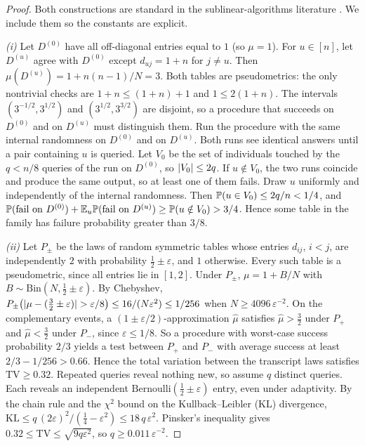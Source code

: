 \begin{proof}
Both constructions are standard in the sublinear-algorithms literature
\citep{barhum2007approximating,goldreich2008approximating}. We include them so
the constants are explicit.

\emph{(i)} Let $D^{(0)}$ have all off-diagonal entries equal to $1$ (so $\mu=1$).
For $u\in[n]$, let $D^{(u)}$ agree with $D^{(0)}$ except $d_{uj}=1+n$ for $j\neq u$.
Then $\mu(D^{(u)})=1+n(n-1)/N=3$. Both tables are pseudometrics: the only
nontrivial checks are $1+n\le(1+n)+1$ and $1\le2(1+n)$. The intervals
$(3^{-1/2},3^{1/2})$ and $(3^{1/2},3^{3/2})$ are disjoint, so a procedure that
succeeds on $D^{(0)}$ and on $D^{(u)}$ must distinguish them. Run the procedure with
the same internal randomness on $D^{(0)}$ and on $D^{(u)}$. Both runs see identical
answers until a pair containing $u$ is queried. Let $V_0$ be the set of individuals
touched by the $q<n/8$ queries of the run on $D^{(0)}$, so $\lvert V_0\rvert\le2q$. If $u\notin V_0$,
the two runs coincide and produce the same output, so at least one of them fails.
Draw $u$ uniformly and independently of the internal randomness. Then
$\mathbb{P}(u\in V_0)\le 2q/n<1/4$, and
$\mathbb{P}(\text{fail on }D^{(0)})+\mathbb{E}_u\mathbb{P}(\text{fail on }D^{(u)})\ge\mathbb{P}(u\notin V_0)>3/4$.
Hence some table in the family has failure probability greater than $3/8$.

\emph{(ii)} Let $P_\pm$ be the laws of random symmetric tables whose entries $d_{ij}$, $i<j$, are
independently $2$ with probability $\tfrac12\pm\varepsilon$, and $1$ otherwise.
Every such table is a pseudometric, since all entries lie in $[1,2]$. Under
$P_\pm$, $\mu=1+B/N$ with $B\sim\mathrm{Bin}(N,\tfrac12\pm\varepsilon)$. By
Chebyshev, $P_\pm\big(\lvert\mu-(\tfrac32\pm\varepsilon)\rvert>\varepsilon/8\big)\le
16/(N\varepsilon^2)\le1/256$ when $N\ge4096\,\varepsilon^{-2}$. On
the complementary events, a $(1\pm\varepsilon/2)$-approximation $\widehat\mu$
satisfies $\widehat\mu>\tfrac32$ under $P_+$ and $\widehat\mu<\tfrac32$ under
$P_-$, since $\varepsilon\le1/8$. So a procedure with worst-case success
probability $2/3$ yields a test between $P_+$ and $P_-$ with average success at
least $2/3-1/256>0.66$. Hence the total variation between the transcript laws
satisfies $\mathrm{TV}\ge0.32$. Repeated queries reveal nothing new, so assume
$q$ distinct queries. Each reveals an independent
$\mathrm{Bernoulli}(\tfrac12\pm\varepsilon)$ entry, even under adaptivity. By the
chain rule and the $\chi^2$ bound on the Kullback--Leibler (KL) divergence,
$\mathrm{KL}\le q\,(2\varepsilon)^2/(\tfrac14-\varepsilon^2)\le 18\,q\,\varepsilon^2$.
Pinsker's inequality gives $0.32\le\mathrm{TV}\le\sqrt{9q\varepsilon^2}$, so
$q\ge0.011\,\varepsilon^{-2}$.


\end{proof}

